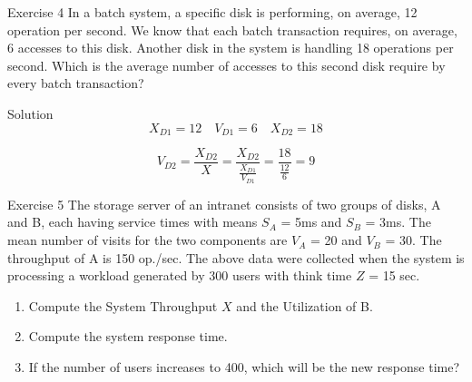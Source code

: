 \documentclass[]{beamer}
\begin{document}

\begin{frame}{Exercise 4}
In a batch system, a specific disk is performing, on average, 12 operation per second. We know that each batch transaction requires, on average, 6 accesses to this disk. Another disk in the system is handling 18 operations per second. Which is the average number of accesses to this second disk require by every batch transaction?
\end{frame}

\begin{frame}{Solution}
$$X_{D1} = 12 \quad V_{D1}=6 \quad X_{D2}=18$$

$$V_{D2} = \frac{X_{D2}}{X} = \frac{X_{D2}}{\frac{X_{D1}}{V_{D1}}} = \frac{18}{\frac{12}{6}} = 9$$
\end{frame}

\begin{frame}{Exercise 5}
The storage server of an intranet consists of two groups of disks, A and B, each having service times with means $S_A$ = 5ms and $S_B$ = 3ms. The mean number of visits for the two
components are $V_A$ = 20 and $V_B$ = 30. The throughput of A is 150 op./sec. The above data were collected
when the system is processing a workload generated by 300 users with think time $Z$ = 15 sec.

\begin{enumerate}
	\item Compute the System Throughput $X$ and the Utilization of B.
	\item Compute the system response time.
	\item If the number of users increases to 400, which will be the new response time?
\end{enumerate}
\end{frame}
\end{document}
